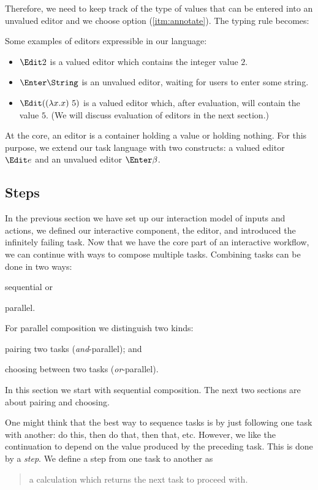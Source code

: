 Therefore,
we need to keep track of the type of values that can be entered into an unvalued editor
and we choose option (\ref{itm:annotate}).
The typing rule becomes:

Some examples of editors expressible in our language:
\begin{itemize}
  \item $\Edit 2$ is a valued editor which contains the integer value $2$.
  \item $\Enter \String$ is an unvalued editor,
    waiting for users to enter some string.
  \item $\Edit ((\lambda x . x)\ 5)$ is a valued editor which,
    after evaluation, will contain the value $5$.
    (We will discuss evaluation of editors in the next section.)
\end{itemize}

At the core,
an editor is a container holding a value
or holding nothing.
For this purpose, we extend our task language with two constructs:
a valued editor $\Edit e$ and an unvalued editor $\Enter \beta$.



\subsection{Steps}

In the previous section we have set up our interaction model of inputs and actions,
we defined our interactive component, the editor,
and introduced the infinitely failing task.
Now that we have the core part of an interactive workflow,
we can continue with ways to compose multiple tasks.
Combining tasks can be done in two ways:
\begin{enumerate*}
  \item sequential or
  \item parallel.
\end{enumerate*}
For parallel composition we distinguish two kinds:
\begin{enumerate*}[(a)]
  \item pairing two tasks (\emph{and}-parallel); and
  \item choosing between two tasks (\emph{or}-parallel).
\end{enumerate*}
In this section we start with sequential composition.
The next two sections are about pairing and choosing.

One might think that the best way to sequence tasks is by just following one task with another:
do this, then do that, then that, etc.
However, we like the continuation to depend on the value produced by the preceding task.
This is done by a \emph{step}.
We define a step from one task to another as
\begin{quote}
  a calculation which returns the next task to proceed with.
\end{quote}

